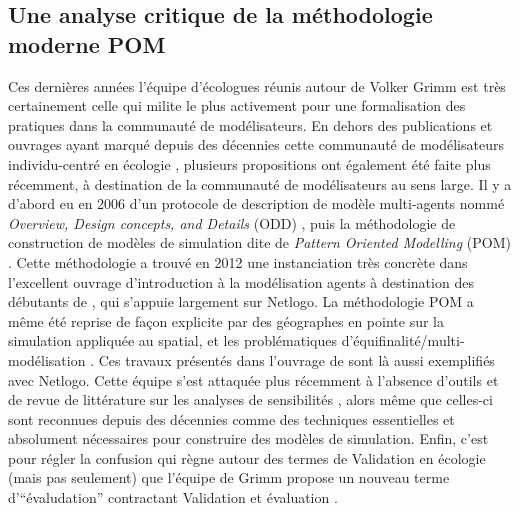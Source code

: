 \subsection{Une analyse critique de la méthodologie moderne POM}
\label{ssec:critique_pom}


Ces dernières années l'équipe d'écologues réunis autour de Volker Grimm est très certainement celle qui milite le plus activement pour une formalisation des pratiques dans la communauté de modélisateurs. En dehors des publications et ouvrages ayant marqué depuis des décennies cette communauté de modélisateurs individu-centré en écologie \autocites{Huston1988,DeAngelis1992,Grimm1999,Grimm2004,DeAngelis2014}, plusieurs propositions ont également été faite plus récemment, à destination de la communauté de modélisateurs au sens large. Il y a d'abord eu en 2006 d'un protocole de description de modèle multi-agents nommé \textit{Overview, Design concepts, and Details} (ODD) \autocite{Grimm2010}, puis la méthodologie de construction de modèles de simulation dite de \textit{Pattern Oriented Modelling} (POM) \autocites{Grimm2005}. Cette méthodologie a trouvé en 2012 une instanciation très concrète dans l'excellent ouvrage d'introduction à la modélisation agents à destination des débutants de \textcite{Railsback2012}, qui s'appuie largement sur Netlogo. La méthodologie POM a même été reprise de façon explicite par des géographes en pointe sur la simulation appliquée au spatial, et les problématiques d'équifinalité/multi-modélisation \autocite{OSullivan2004, Millington2012}. Ces travaux présentés dans l'ouvrage de \textcite{OSullivan2013} sont là aussi exemplifiés avec Netlogo. Cette équipe s'est attaquée plus récemment à l'absence d'outils \autocite{Thiele2014b} et de revue de littérature sur les analyses de sensibilités \autocites{Thiele2012,Thiele2014a}, alors même que celles-ci sont reconnues depuis des décennies comme des techniques essentielles et absolument nécessaires pour construire des modèles de simulation. Enfin, c'est pour régler la confusion qui règne autour des termes de Validation en écologie (mais pas seulement) que l'équipe de Grimm propose un nouveau terme d'\enquote{évaludation} contractant Validation et évaluation \autocite{Augusiak2014}. 

